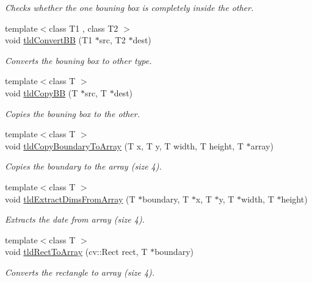 \begin{DoxyCompactItemize}
\begin{DoxyCompactList}\small\item\em Checks whether the one bouning box is completely inside the other. \end{DoxyCompactList}\item 
{\footnotesize template$<$class T1 , class T2 $>$ }\\void \hyperlink{namespacetld_a76d4a1c9344fcb821fda1f8c6ad587bc}{tld\-Convert\-B\-B} (T1 $\ast$src, T2 $\ast$dest)
\begin{DoxyCompactList}\small\item\em Converts the bouning box to other type. \end{DoxyCompactList}\item 
{\footnotesize template$<$class T $>$ }\\void \hyperlink{namespacetld_ac08655e901fb2ced507566217d4b5aca}{tld\-Copy\-B\-B} (T $\ast$src, T $\ast$dest)
\begin{DoxyCompactList}\small\item\em Copies the bouning box to the other. \end{DoxyCompactList}\item 
{\footnotesize template$<$class T $>$ }\\void \hyperlink{namespacetld_aefacde9f718a4102ac40901afa1b35f7}{tld\-Copy\-Boundary\-To\-Array} (T x, T y, T width, T height, T $\ast$array)
\begin{DoxyCompactList}\small\item\em Copies the boundary to the array (size 4). \end{DoxyCompactList}\item 
{\footnotesize template$<$class T $>$ }\\void \hyperlink{namespacetld_aff4c05bc28ae29c360be58460a56b579}{tld\-Extract\-Dims\-From\-Array} (T $\ast$boundary, T $\ast$x, T $\ast$y, T $\ast$width, T $\ast$height)
\begin{DoxyCompactList}\small\item\em Extracts the date from array (size 4). \end{DoxyCompactList}\item 
{\footnotesize template$<$class T $>$ }\\void \hyperlink{namespacetld_a18975268ebbf3daf5eaf46d30fd782e9}{tld\-Rect\-To\-Array} (cv\-::\-Rect rect, T $\ast$boundary)
\begin{DoxyCompactList}\small\item\em Converts the rectangle to array (size 4). \end{DoxyCompactList}\item 

\end{DoxyCompactItemize}

